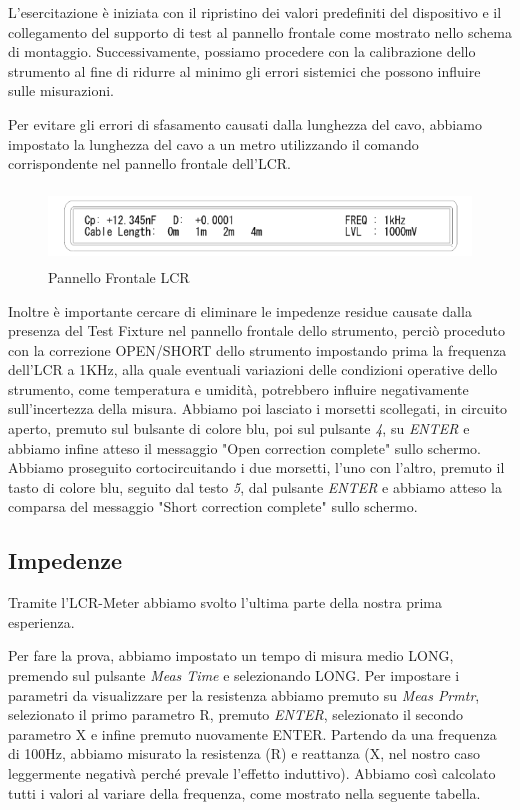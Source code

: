 L'esercitazione è iniziata con il ripristino dei valori predefiniti del dispositivo e il collegamento del supporto di test al pannello frontale come mostrato nello schema di montaggio. Successivamente, possiamo procedere con la calibrazione dello strumento al fine di ridurre al minimo gli errori sistemici che possono influire sulle misurazioni.

Per evitare gli errori di sfasamento causati dalla lunghezza del cavo, abbiamo impostato la lunghezza del cavo a un metro utilizzando il comando corrispondente nel pannello frontale dell'LCR.

\begin{figure}[ht]
    \centering
    \includegraphics[height=2cm]{media/pannello_frontale_LCR.png}
    \caption{Pannello Frontale LCR}
    \label{fig:pannello_frontale_LCR}
\end{figure}
\FloatBarrier

Inoltre è importante cercare di eliminare le impedenze residue causate dalla presenza del Test Fixture nel pannello frontale dello strumento, perciò proceduto con la correzione OPEN/SHORT dello strumento impostando prima la frequenza dell'LCR a 1KHz, alla quale eventuali variazioni delle condizioni operative dello strumento, come temperatura e umidità, potrebbero influire negativamente sull'incertezza della misura. Abbiamo poi lasciato i morsetti scollegati, in circuito aperto, premuto sul bulsante di colore blu, poi sul pulsante \emph{4}, su \emph{ENTER} e abbiamo infine atteso il messaggio "Open correction complete" sullo schermo. Abbiamo proseguito cortocircuitando i due morsetti, l'uno con l'altro, premuto il tasto di colore blu, seguito dal testo \emph{5}, dal pulsante \emph{ENTER} e abbiamo atteso la comparsa del messaggio "Short correction complete" sullo schermo.
 

\subsection{Impedenze}
\label{sub:z}

Tramite l'LCR-Meter abbiamo svolto l'ultima parte della nostra prima esperienza.

Per fare la prova, abbiamo impostato un tempo di misura medio LONG, premendo sul pulsante \emph{Meas Time} e selezionando LONG.
Per impostare i parametri da visualizzare per la resistenza abbiamo premuto su \emph{Meas Prmtr}, selezionato il primo parametro R, premuto \emph{ENTER}, selezionato il secondo parametro X e infine premuto nuovamente ENTER.
Partendo da una frequenza di 100Hz, abbiamo misurato la resistenza (R) e reattanza (X, nel nostro caso leggermente negativà perché prevale l'effetto induttivo). Abbiamo così calcolato tutti i valori al variare della frequenza, come mostrato nella seguente tabella.  


